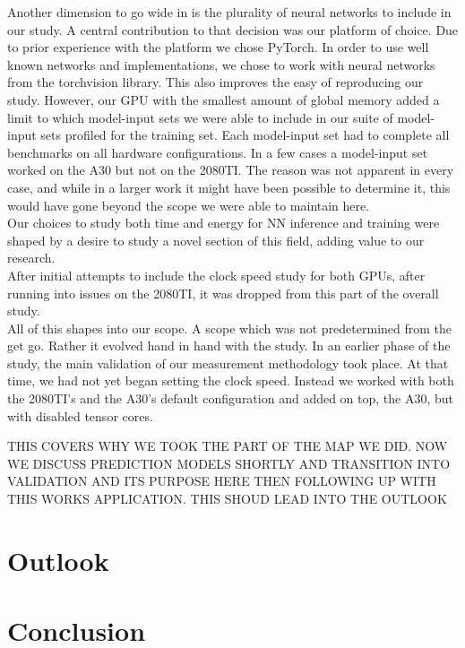 Another dimension to go wide in is the plurality of neural networks to include in our study. A central contribution to that decision was our platform of choice. Due to prior experience with the platform we chose PyTorch. In order to use well known networks and implementations, we chose to work with neural networks from the torchvision library. This also improves the easy of reproducing our study. However, our GPU with the smallest amount of global memory added a limit to which model-input sets we were able to include in our suite of model-input sets profiled for the training set. Each model-input set had to complete all benchmarks on all hardware configurations. In a few cases a model-input set worked on the A30 but not on the 2080TI. The reason was not apparent in every case, and while in a larger work it might have been possible to determine it, this would have gone beyond the scope we were able to maintain here. \\
Our choices to study both time and energy for NN inference and training were shaped by a desire to study a novel section of this field, adding value to our research.  \\
After initial attempts to include the clock speed study for both GPUs, after running into issues on the 2080TI, it was dropped from this part of the overall study.\\
All of this shapes into our scope. A scope which was not predetermined from the get go. Rather it evolved hand in hand with the study. In an earlier phase of the study, the main validation of our measurement methodology took place. At that time, we had not yet began setting the clock speed. Instead we worked with both the 2080TI's and the A30's default configuration and added on top, the A30, but with disabled tensor cores. 

THIS COVERS WHY WE TOOK THE PART OF THE MAP WE DID. NOW WE DISCUSS PREDICTION MODELS SHORTLY AND TRANSITION INTO VALIDATION AND ITS PURPOSE HERE THEN FOLLOWING UP WITH THIS WORKS APPLICATION. THIS SHOUD LEAD INTO THE OUTLOOK



\section{Outlook}

\section{Conclusion}
